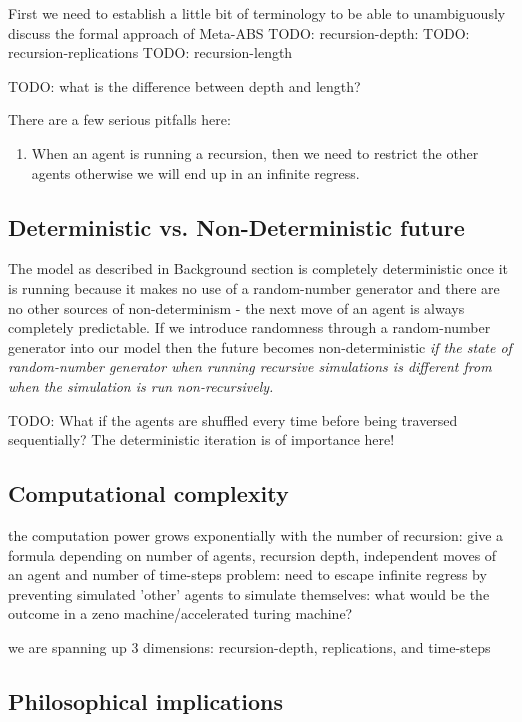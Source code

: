 First we need to establish a little bit of terminology to be able to unambiguously discuss the formal approach of Meta-ABS
TODO: recursion-depth:
TODO: recursion-replications
TODO: recursion-length

TODO: what is the difference between depth and length?

There are a few serious pitfalls here: 
\begin{enumerate}
	\item When an agent is running a recursion, then we need to restrict the other agents otherwise we will end up in an infinite regress.
\end{enumerate}
	

\subsection{Deterministic vs. Non-Deterministic future}
The model as described in Background section is completely deterministic once it is running because it makes no use of a random-number generator and there are no other sources of non-determinism - the next move of an agent is always completely predictable. If we introduce randomness through a random-number generator into our model then the future becomes non-deterministic \textit{if the state of random-number generator when running recursive simulations is different from when the simulation is run non-recursively.}

TODO: What if the agents are shuffled every time before being traversed sequentially? The deterministic iteration is of importance here!

\subsection{Computational complexity}
the computation power grows exponentially with the number of recursion: give a formula depending on number of agents, recursion depth, independent moves of an agent and number of time-steps 
problem: need to escape infinite regress by preventing simulated 'other' agents to simulate themselves: what would be the outcome in a zeno machine/accelerated turing machine?

we are spanning up 3 dimensions: recursion-depth, replications, and time-steps

\subsection{Philosophical implications}

